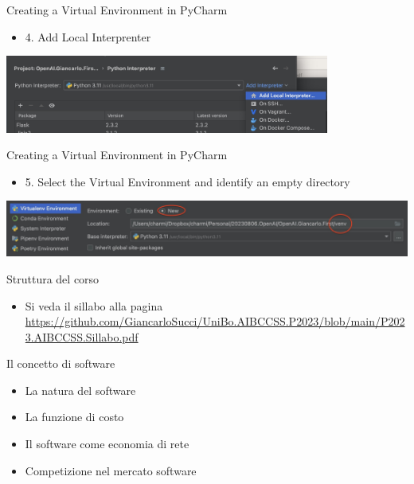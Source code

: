 \documentclass{beamer}
\begin{document}
\begin{frame}
{\centerline{Creating a Virtual Environment in PyCharm}}
\begin{itemize}
    \item 4. Add Local Interprenter
\end{itemize} 
\begin{center}
    \includegraphics[width=0.8\textwidth]{Coding/PyCharm.AddLocalInterpreter.jpg}
\end{center}
\end{frame}

\begin{frame}
{\centerline{Creating a Virtual Environment in PyCharm}}
\begin{itemize}
    \item 5. Select the Virtual Environment and identify an empty directory
\end{itemize} 
\begin{center}
    \includegraphics[width=\textwidth]{Coding/PyCharm.VirtualEnvironment.jpg}
\end{center}
\end{frame}




\begin{frame}
{\centerline{Struttura del corso}}
\begin{itemize}
    \item Si veda il sillabo alla pagina \url{https://github.com/GiancarloSucci/UniBo.AIBCCSS.P2023/blob/main/P2023.AIBCCSS.Sillabo.pdf}
\end{itemize} 
\end{frame}


\begin{frame}
{\centerline{Il concetto di software}}
\begin{itemize}
    \item La natura del software
    \item La funzione di costo
    \item Il software come economia di rete 
    \item Competizione nel mercato software
\end{itemize} 
\end{frame}
\end{document}

